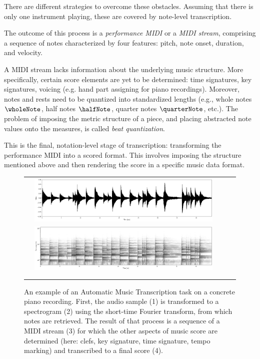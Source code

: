 There are different strategies to overcome these obstacles. Assuming that there is only one instrument playing, these are covered by note-level transcription.

The outcome of this process is a \emph{performance MIDI} or a \emph{MIDI stream}, comprising a sequence of notes characterized by four features: pitch, note onset, duration, and velocity.

A MIDI stream lacks information about the underlying music structure. More specifically, certain score elements are yet to be determined: time signatures, key signatures, voicing (e.g. hand part assigning for piano recordings). Moreover, notes and rests need to be quantized into standardized lengths (e.g., whole notes $\wholeNote$, half notes $\halfNote$, quarter notes $\quarterNote$, etc.). The problem of imposing the metric structure of a piece, and placing abstracted note values onto the measures, is called \emph{beat quantization}.

This is the final, notation-level stage of transcription: transforming the performance MIDI into a scored format. This involves imposing the structure mentioned above and then rendering the score in a specific music data format.

\begin{figure}[ht!]
\centering
\begin{tabular}{>{\centering\arraybackslash} m{} >{\centering\arraybackslash} m{}}
1 &\includegraphics[width=0.9\textwidth]{images/amt_0.png} \\
2 &\includegraphics[width=0.9\textwidth]{images/amt_1.png} \\
3 & \\
4 &
\end{tabular}
\caption[An example of an Automatic Music Transcription task on a concrete piano recording.]{An example of an Automatic Music Transcription task on a concrete piano recording. First, the audio sample (1) is transformed to a spectrogram (2) using the short-time Fourier transform, from which notes are retrieved. The result of that process is a sequence of a MIDI stream (3) for which the other aspects of music score are determined (here: clefs, key signature, time signature, tempo marking) and transcribed to a final score (4).}
\end{figure}

